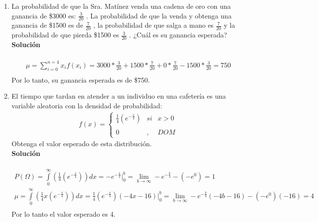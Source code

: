 \begin{enumerate}
    \item La probabilidad de que la Sra. Matínez venda una cadena de oro con una ganancia de \$3000 es: $ \frac{3}{20} $ . La probabilidad de que la venda y obtenga una ganancia de \$1500 es de $ \frac{7}{20} $ , la probabilidad de que salga a mano es $ \frac{7}{20} $ y la probabilidad de que pierda \$1500 es $ \frac{3}{20} $ . ¿Cuál es su ganancia esperada?
    \\\textbf{Solución}
    \\ \\
    \begin{gather*}
    \mu = \sum_{i = 0}^{n = 4} x_{i}f(x_{i}) = 3000*\frac{3}{20} + 1500*\frac{7}{20} + 0*\frac{7}{20} - 1500*\frac{3}{20} = 750 \\
    \end{gather*}
    Por lo tanto, su ganancia esperada es de \$750. \\
    
    \item El tiempo que tardan en atender a un individuo en una cafetería es una variable aleatoria con la densidad de probabilidad: \\
    \begin{align*}
    f(x)= \left\{ \begin{array}{lcc}
    \frac{1}{4}(e^{-\frac{x}{4}}) &   si  & x > 0 \\
    \\ 0 &  ,  & DOM
    \end{array}
    \right.
    \end{align*}
    Obtenga el valor esperado de esta distribución.
    \\\textbf{Solución}
    \\ \\
    \begin{gather*}
    P(\Omega) = \int \limits_{0}^\infty (\frac{1}{4}(e^{-\frac{x}{4}})) dx = -e^{-\frac{x}{4}} \bigg\vert_{0}^{b} = \lim \limits_{b \rightarrow \infty} -e^{-\frac{b}{4}} - (-e^{0}) = 1 \\
    \mu = \int \limits_{0}^\infty (\frac{1}{4}x(e^{-\frac{x}{4}})) dx = \frac{1}{4}(e^{-\frac{x}{4}})(-4x-16) \bigg\vert_{0}^b = \lim \limits_{b \rightarrow \infty} -e^{-\frac{b}{4}}(-4b -16) - (-e^{0})(-16) = 4 \\
    \end{gather*}
    Por lo tanto el valor esperado es 4. \\
    

\end{enumerate}
